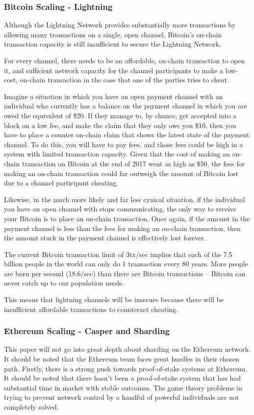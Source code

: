\documentclass[a4paper,12pt]{article}
\begin{document}
\subsubsection{Bitcoin Scaling - Lightning}
Although the Lightning Network provides substantially more transactions by allowing many transactions on a single, open channel, Bitcoin’s on-chain transaction capacity is still insufficient to secure the Lightning Network. 

For every channel, there needs to be an affordable, on-chain transaction to open it, and sufficient network capacity for the channel participants to make a low-cost, on-chain transaction in the case that one of the parties tries to cheat. 

Imagine a situation in which you have an open payment channel with an individual who currently has a balance on the payment channel in which you are owed the equivalent of \$20. If they manage to, by chance, get accepted into a block on a low fee, and make the claim that they only owe you \$10, then you have to place a counter on-chain claim that shows the latest state of the payment channel. To do this, you will have to pay fees, and those fees could be high in a system with limited transaction capacity. Given that the cost of making an on-chain transaction on Bitcoin at the end of 2017 went as high as \$50, the fees for making an on-chain transaction could far outweigh the amount of Bitcoin lost due to a channel participant cheating. 

Likewise, in the much more likely and far less cynical situation, if the individual you have an open channel with stops communicating, the only way to receive your Bitcoin is to place an on-chain transaction. Once again, if the amount in the payment channel is less than the fees for making an on-chain transaction, then the amount stuck in the payment channel is effectively lost forever.

The current Bitcoin transaction limit of 3tx/sec implies that each of the 7.5 billion people in the world can only do 1 transaction every 80 years. More people are born per second (18.6/sec) than there are Bitcoin transactions – Bitcoin can never catch up to our population needs.

This means that lightning channels will be insecure because there will be insufficient affordable transactions to counteract cheating.


\subsubsection{Ethereum Scaling - Casper and Sharding}
This paper will not go into great depth about sharding on the Ethereum network. It should be noted that the Ethereum team faces great hurdles in their chosen path. Firstly, there is a strong push towards proof-of-stake systems at Ethereum. It should be noted that there hasn't been a proof-of-stake system that has had substantial time in market with stable outcomes. The game theory problems in trying to prevent network control by a handful of powerful individuals are not completely solved.
\end{document}
